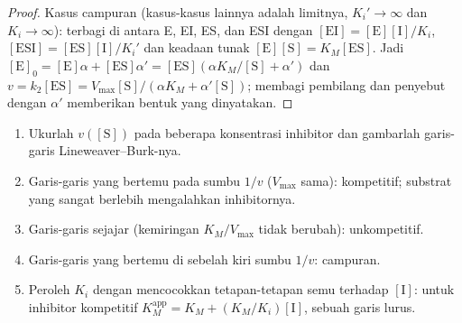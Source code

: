 \begin{proof}
Kasus campuran (kasus-kasus lainnya adalah limitnya, $K_i' \to \infty$ dan
$K_i \to \infty$):  terbagi di antara E, EI, ES, dan ESI dengan
$[\mathrm{EI}] = [\mathrm E][\mathrm I]/K_i$, $[\mathrm{ESI}] = [\mathrm{ES}][\mathrm I]/K_i'$
dan keadaan tunak $[\mathrm E][\mathrm S] = K_M[\mathrm{ES}]$. Jadi $[\mathrm E]_0 = [\mathrm E]\alpha + [\mathrm{ES}]\alpha' =
[\mathrm{ES}](\alpha K_M/[\mathrm S] + \alpha')$ dan $v = k_2[\mathrm{ES}] = V_{\max}[\mathrm S]/(\alpha K_M + \alpha'[\mathrm S])$;
membagi pembilang dan penyebut dengan $\alpha'$ memberikan bentuk yang
dinyatakan.
\end{proof}

\begin{method}\label{met:b3:complex-kinetics:inhibition-type}
\begin{enumerate}
  \item Ukurlah $v([\mathrm S])$ pada beberapa konsentrasi inhibitor dan
        gambarlah garis-garis Lineweaver--Burk-nya.
  \item Garis-garis yang bertemu pada sumbu $1/v$ ($V_{\max}$ sama): kompetitif;
        substrat yang sangat berlebih mengalahkan inhibitornya.
  \item Garis-garis sejajar (kemiringan $K_M/V_{\max}$ tidak berubah):
        unkompetitif.
  \item Garis-garis yang bertemu di sebelah kiri sumbu $1/v$: campuran.
  \item Peroleh $K_i$ dengan mencocokkan tetapan-tetapan semu terhadap
        $[\mathrm I]$: untuk inhibitor kompetitif
        $K_M^{\mathrm{app}} = K_M + (K_M/K_i)[\mathrm I]$, sebuah garis lurus.
\end{enumerate}
\end{method}

